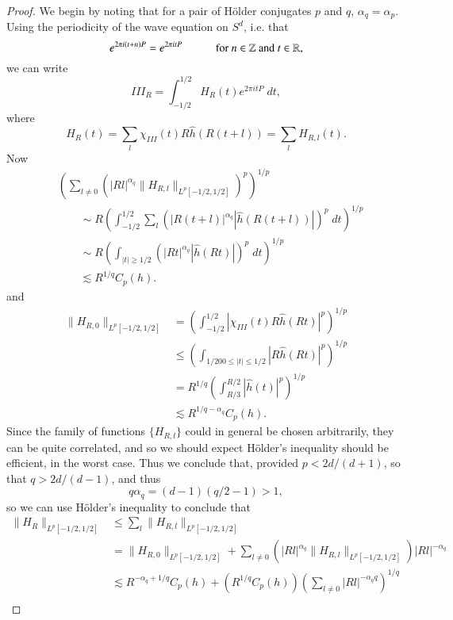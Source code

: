 \begin{proof}
    We begin by noting that for a pair of H\"{o}lder conjugates $p$ and $q$, $\alpha_q = \alpha_p$. Using the periodicity of the wave equation on $S^d$, i.e. that
    \[ e^{2 \pi i (t + n) P} = e^{2 \pi i t P} \quad\quad\quad\text{for $n \in \operatorname{\mathbb{Z}}$ and $t \in \operatorname{\mathbb{R}}$}, \]
    we can write
    \[ III_R = \int_{-1/2}^{1/2} H_R(t) e^{2 \pi i t P}\; dt, \]
    where
    \[ H_R(t) = \sum_l \chi_{III}(t) R \widehat{h}(R(t + l)) = \sum_l H_{R,l}(t). \]
    Now
    \begin{align*}
        &\left( \sum_{l \neq 0} \left( |Rl|^{\alpha_q} \| H_{R,l} \|_{L^p[-1/2,1/2]} \right)^p \right)^{1/p}\\
        &\quad\quad \sim R \left( \int_{-1/2}^{1/2} \sum_l \left( |R(t + l)|^{\alpha_q} |\widehat{h}(R(t + l))| \right)^p\; dt \right)^{1/p}\\
        &\quad\quad\sim R \left( \int_{|t| \geq 1/2} \left( |Rt|^{\alpha_q} |\widehat{h}(Rt)| \right)^p\; dt \right)^{1/p} \\
        &\quad\quad\lesssim R^{1/q} C_p(h).
    \end{align*}
    and
    \begin{align*}
        \| H_{R,0} \|_{L^p[-1/2,1/2]} &= \left( \int_{-1/2}^{1/2} |\chi_{III}(t) R \widehat{h}(Rt)|^p \right)^{1/p}\\
        &\leq \left( \int_{1/200 \leq |t| \leq 1/2} |R \widehat{h}(Rt)|^p \right)^{1/p}\\
        &= R^{1/q} \left( \int_{R/3}^{R/2} |\widehat{h}(t)|^p \right)^{1/p}\\
        &\lesssim R^{1/q - \alpha_q} C_p(h).
    \end{align*}
    Since the family of functions $\{ H_{R,l} \}$ could in general be chosen arbitrarily, they can be quite correlated, and so we should expect H\"{o}lder's inequality should be efficient, in the worst case. Thus we conclude that, provided $p < 2d/(d+1)$, so that $q > 2d/(d-1)$, and thus
    \[ q \alpha_q = (d-1)(q/2 - 1) > 1, \]
    so we can use H\"{o}lder's inequality to conclude that
    \begin{align*}
        \| H_R \|_{L^p[-1/2,1/2]} &\leq \sum_l \| H_{R,l} \|_{L^p[-1/2,1/2]}\\
        &= \| H_{R,0} \|_{L^p[-1/2,1/2]} + \sum_{l \neq 0} \left( |Rl|^{\alpha_q} \| H_{R,l} \|_{L^p[-1/2,1/2]} \right) |Rl|^{-\alpha_q} \\
        &\lesssim R^{-\alpha_q + 1/q} C_p(h) + ( R^{1/q} C_p(h) ) \left( \sum_{l \neq 0} |Rl|^{- \alpha_q q} \right)^{1/q}\\

\end{align*}
\end{proof}
